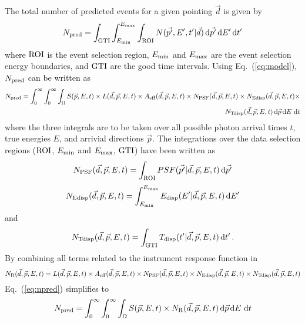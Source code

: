 \documentclass{article}[12pt,a4]
\begin{document}
The total number of predicted events for a given pointing $\vec{d}$ is given by
\begin{equation}
N_{\rm pred} = \int_{\rm GTI} \int_{E_{\rm min}}^{E_{\rm max}} \int_{\rm ROI} 
N(\vec{p'}, E', t' | \vec{d}) \, {\rm d}\vec{p'} \, {\rm d}E' \,{\rm d}t'
\end{equation}
where
${\rm ROI}$ is the event selection region,
$E_{\rm min}$ and $E_{\rm max}$ are the event selection energy boundaries, and
${\rm GTI}$ are the good time intervals.
Using Eq.~(\ref{eq:model}), $N_{\rm pred}$ can be written as
\begin{eqnarray}
N_{\rm pred} = \int_{0}^{\infty} \int_{0}^{\infty} \int_{\Omega} 
S(\vec{p}, E, t) \times 
L(\vec{d}, \vec{p}, E, t) \times
A_{\rm eff}(\vec{d}, \vec{p}, E, t) \times
N_{\rm PSF}(\vec{d}, \vec{p}, E, t) \times
N_{\rm Edisp}(\vec{d}, \vec{p}, E, t) \times \nonumber \\
N_{\rm Tdisp}(\vec{d}, \vec{p}, E, t) 
\, {\rm d}\vec{p} \, {\rm d}E \, \,{\rm d}t
\label{eq:npred}
\end{eqnarray}
where the three integrals are to be taken over all possible photon arrival times $t$, 
true energies $E$, and arrivial directions $\vec{p}$.
The integrations over the data selection regions (${\rm ROI}$, $E_{\rm min}$ and $E_{\rm max}$,
${\rm GTI}$) have been written as
\begin{equation}
N_{\rm PSF}(\vec{d}, \vec{p}, E, t) = \int_{\rm ROI} PSF(\vec{p'} | \vec{d}, \vec{p}, E, t) \, {\rm d}\vec{p'}
\end{equation}
\begin{equation}
N_{\rm Edisp}(\vec{d}, \vec{p}, E, t) = \int_{E_{\rm min}}^{E_{\rm max}} 
E_{\rm disp}(E' | \vec{d}, \vec{p}, E, t) \, {\rm d}E'
\end{equation}
and
\begin{equation}
N_{\rm Tdisp}(\vec{d}, \vec{p}, E, t) = \int_{\rm GTI} T_{\rm disp}(t' | \vec{d}, \vec{p}, E, t) \, {\rm d}t' \, .
\end{equation}
By combining all terms related to the instrument response function in
\begin{equation}
N_{\rm R}(\vec{d}, \vec{p}, E, t) = 
L(\vec{d}, \vec{p}, E, t) \times
A_{\rm eff}(\vec{d}, \vec{p}, E, t) \times
N_{\rm PSF}(\vec{d}, \vec{p}, E, t) \times
N_{\rm Edisp}(\vec{d}, \vec{p}, E, t) \times
N_{\rm Tdisp}(\vec{d}, \vec{p}, E, t)
\end{equation}
Eq.~(\ref{eq:npred}) simplifies to
\begin{equation}
N_{\rm pred} = \int_{0}^{\infty} \int_{0}^{\infty} \int_{\Omega} 
S(\vec{p}, E, t) \times 
N_{\rm R}(\vec{d}, \vec{p}, E, t)
\, {\rm d}\vec{p} \, {\rm d}E \, \,{\rm d}t
\end{equation}
\end{document}
